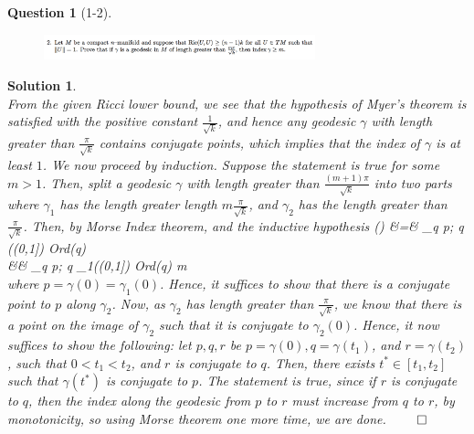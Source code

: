 \documentclass[11pt]{article}
\theoremstyle{plain}
\def\eQb#1\eQe{\begin{eqnarray*}#1\end{eqnarray*}}
\theoremstyle{quest}
\newtheorem*{question}{Question}
\newtheorem*{solution}{Solution}
\begin{document}
\begin{question}[1-2]
\hfill
\begin{figure}[h!]
  \centering
    \includegraphics[width=0.7\textwidth]{dg-s5-p2.png}
\end{figure}
\end{question}
\begin{solution} \hfill \\
From the given Ricci lower bound, we see that the hypothesis of Myer's theorem is 
satisfied with the positive constant $\frac{1}{\sqrt{k}}$, and hence 
any geodesic $\gamma$ with length greater than $\frac{\pi}{\sqrt{k}}$ contains
conjugate points, which implies that the index of $\gamma$ is at least $1$. We now
proceed by induction. Suppose the statement is true for some $m  > 1$. Then, 
split a geodesic $\gamma$ with length greater than $\frac{(m+1)\pi}{\sqrt{k}}$ 
into two parts where $\gamma_1$ has the length 
greater length $m\frac{\pi}{\sqrt{k}}$, and $\gamma_2$ has the length greater than
$\frac{\pi}{\sqrt{k}}$. Then, by Morse Index theorem, and the inductive hypothesis
\eQb
\text{Index}(\gamma) &=& 
\sum_{q \>  p; \> q \in \gamma((0,1])} 
Ord(q) \\
&\geq&
\sum_{q \>  p; \> q \in \gamma_1((0,1])} 
Ord(q) \geq m \\
\eQe 
where $p = \gamma(0) = \gamma_1(0)$. Hence, it suffices to show that there is a 
conjugate point to $p$ along $\gamma_2$. Now, as $\gamma_2$ has length greater than
$\frac{\pi}{\sqrt{k}}$, we know that there is a point on the image of $\gamma_2$
such that it is conjugate to $\gamma_2(0)$. Hence, it now suffices to show the following:
let $p,q,r$ be $p = \gamma(0), q = \gamma(t_1)$, and $r = \gamma(t_2)$, such that
$0 < t_1 < t_2$, and
$r$ is conjugate to $q$. Then, there exists $t^* \in [t_1,t_2]$ such that 
$\gamma(t^*)$ is conjugate to $p$. The statement is true, since if $r$ is conjugate
to $q$, then the index along the geodesic from $p$ to $r$ must increase from
$q$ to $r$, by monotonicity, so using Morse theorem one more time,
 we are done. \hfill $\qed$
\end{solution}

\newpage
\end{document}

